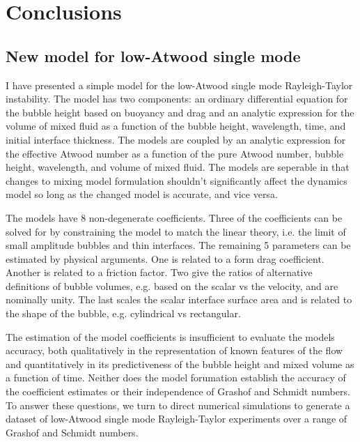 \chapter{Conclusions}


\section{New model for low-Atwood single mode}
I have presented a simple model for the low-Atwood single mode Rayleigh-Taylor instability.
The model has two components: an ordinary differential equation for the bubble height based on buoyancy and drag and an analytic expression for the volume of mixed fluid as a function of the bubble height, wavelength, time, and initial interface thickness.
The models are coupled by an analytic expression for the effective Atwood number as a function of the pure Atwood number, bubble height, wavelength, and volume of mixed fluid.
The models are seperable in that changes to mixing model formulation shouldn't significantly affect the dynamics model so long as the changed model is accurate, and vice versa.

The models have 8 non-degenerate coefficients.
Three of the coefficients can be solved for by constraining the model to match the linear theory, i.e. the limit of small amplitude bubbles and thin interfaces.
The remaining 5 parameters can be estimated by physical arguments.
One is related to a form drag coefficient.
Another is related to a friction factor.
Two give the ratios of alternative definitions of bubble volumes, e.g. based on the scalar vs the velocity, and are nominally unity.
The last scales the scalar interface surface area and is related to the shape of the bubble, e.g. cylindrical vs rectangular.

The estimation of the model coefficients is insufficient to evaluate the models accuracy, both qualitatively in the representation of known features of the flow and quantitatively in its predictiveness of the bubble height and mixed volume as a function of time.
Neither does the model forumation establish the accuracy of the coefficient estimates or their independence of Grashof and Schmidt numbers.
To answer these questions, we turn to direct numerical simulations to generate a dataset of low-Atwood single mode Rayleigh-Taylor experiments over a range of Grashof and Schmidt numbers.

